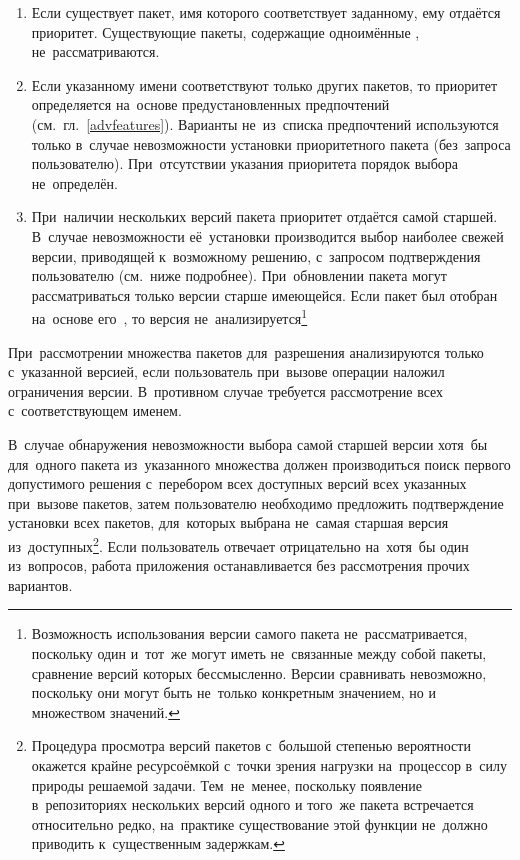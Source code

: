 \begin{enumerate}

\item{
Если существует пакет, имя которого соответствует заданному, ему отдаётся приоритет.
Существующие пакеты, содержащие одноимённые , не~рассматриваются.
}

\item {
Если указанному имени соответствуют только  других пакетов,
то приоритет определяется на~основе предустановленных предпочтений (см.~гл.~\ref{advfeatures}).
Варианты не~из~списка предпочтений используются только в~случае невозможности установки приоритетного пакета (без~запроса пользователю).
При~отсутствии указания приоритета порядок выбора не~определён.
}

\item {
При~наличии нескольких версий пакета приоритет отдаётся самой старшей.
В~случае невозможности её~установки производится выбор наиболее свежей версии, приводящей к~возможному решению, с~запросом подтверждения пользователю (см.~ниже подробнее).
При~обновлении пакета могут рассматриваться только версии старше имеющейся.
Если пакет был отобран на~основе его~, 
то версия не~анализируется\footnote{
Возможность использования версии самого пакета не~рассматривается,
поскольку один и~тот~же  могут иметь не~связанные между собой пакеты, сравнение версий которых бессмысленно.
Версии  сравнивать невозможно, поскольку они могут быть не~только конкретным значением, но и множеством значений.}
}

\end{enumerate}

При~рассмотрении множества пакетов для~разрешения 
анализируются  только с~указанной версией, если пользователь при~вызове операции наложил ограничения версии.
В~противном случае требуется рассмотрение всех  с~соответствующем именем.

В~случае обнаружения невозможности выбора самой старшей версии хотя~бы для~одного пакета из~указанного множества
должен производиться поиск первого допустимого решения с~перебором всех доступных версий всех указанных при~вызове пакетов,
затем пользователю необходимо предложить подтверждение установки всех пакетов, для~которых выбрана не~самая старшая версия из~доступных\footnote{
Процедура просмотра версий пакетов с~большой степенью вероятности окажется крайне ресурсоёмкой с~точки зрения нагрузки на~процессор в~силу природы решаемой задачи.
Тем~не~менее, поскольку появление в~репозиториях нескольких версий одного и того~же пакета встречается относительно редко,
на~практике существование этой функции не~должно приводить к~существенным задержкам.
}.
Если пользователь отвечает отрицательно на~хотя~бы один из~вопросов, работа приложения останавливается без рассмотрения прочих вариантов.

